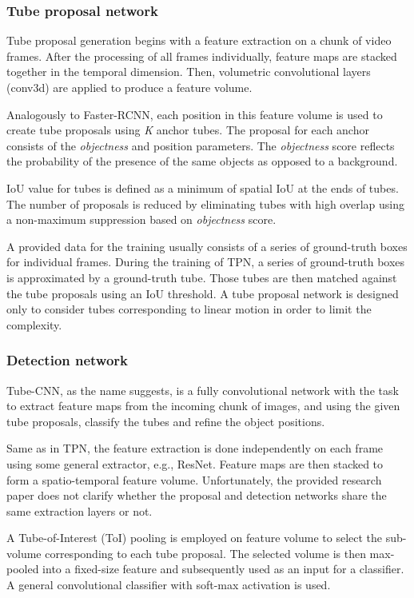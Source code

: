\subsubsection{Tube proposal network}
Tube proposal generation begins with a feature extraction on a chunk of video frames. After the processing of all frames individually, feature maps are stacked together in the temporal dimension. Then, volumetric convolutional layers (conv3d) are applied to produce a feature volume.

Analogously to Faster-RCNN, each position in this feature volume is used to create tube proposals using \textit{K} anchor tubes. The proposal for each anchor consists of the \textit{objectness} and position parameters. The \textit{objectness} score reflects the probability of the presence of the same objects as opposed to a background. 

IoU value for tubes is defined as a minimum of spatial IoU at the ends of tubes. The number of proposals is reduced by eliminating tubes with high overlap using a non-maximum suppression based on \textit{objectness} score. 

A provided data for the training usually consists of a series of ground-truth boxes for individual frames. During the training of TPN, a series of ground-truth boxes is approximated by a ground-truth tube. Those tubes are then matched against the tube proposals using an IoU threshold. A tube proposal network is designed only to consider tubes corresponding to linear motion in order to limit the complexity. 

\subsubsection{Detection network}
Tube-CNN, as the name suggests, is a fully convolutional network with the task to extract feature maps from the incoming chunk of images, and using the given tube proposals, classify the tubes and refine the object positions. 

Same as in TPN, the feature extraction is done independently on each frame using some general extractor, e.g., ResNet. Feature maps are then stacked to form a spatio-temporal feature volume. Unfortunately, the provided research paper does not clarify whether the proposal and detection networks share the same extraction layers or not.

A Tube-of-Interest (ToI) pooling is employed on feature volume to select the sub-volume corresponding to each tube proposal. The selected volume is then max-pooled into a fixed-size feature and subsequently used as an input for a classifier. A general convolutional classifier with soft-max activation is used. 

